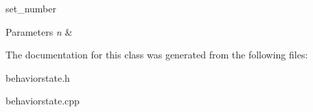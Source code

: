 set\+\_\+number 


\begin{DoxyParams}{Parameters}
{\em n} & \\
\hline
\end{DoxyParams}


The documentation for this class was generated from the following files\+:\begin{DoxyCompactItemize}
\item 
behaviorstate.\+h\item 
behaviorstate.\+cpp\end{DoxyCompactItemize}
